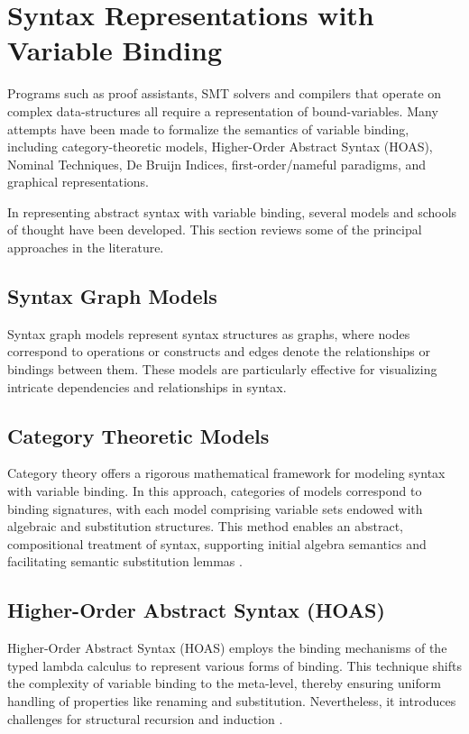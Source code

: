 \documentclass{article}
\begin{document}
\section{Syntax Representations with Variable Binding}
Programs such as proof assistants, SMT solvers and compilers that operate on
complex data-structures all require a representation of bound-variables. Many
attempts have been made to formalize the semantics of variable binding,
including category-theoretic models, Higher-Order Abstract Syntax (HOAS),
Nominal Techniques, De Bruijn Indices, first-order/nameful paradigms, and
graphical representations. 

In representing abstract syntax with variable binding, several models and
schools of thought have been developed. This section reviews some of the
principal approaches in the literature.

\subsection{Syntax Graph Models}
Syntax graph models represent syntax structures as graphs, where nodes
correspond to operations or constructs and edges denote the relationships or
bindings between them. These models are particularly effective for visualizing
intricate dependencies and relationships in syntax.

\subsection{Category Theoretic Models}
Category theory offers a rigorous mathematical framework for modeling syntax
with variable binding. In this approach, categories of models correspond to
binding signatures, with each model comprising variable sets endowed with
algebraic and substitution structures. This method enables an abstract,
compositional treatment of syntax, supporting initial algebra semantics and
facilitating semantic substitution lemmas \cite{fiore99cat}.

\subsection{Higher-Order Abstract Syntax (HOAS)}
Higher-Order Abstract Syntax (HOAS) employs the binding mechanisms of the typed
lambda calculus to represent various forms of binding. This technique shifts the
complexity of variable binding to the meta-level, thereby ensuring uniform
handling of properties like renaming and substitution. Nevertheless, it
introduces challenges for structural recursion and induction \cite{gabbay02hoas}.
\end{document}
